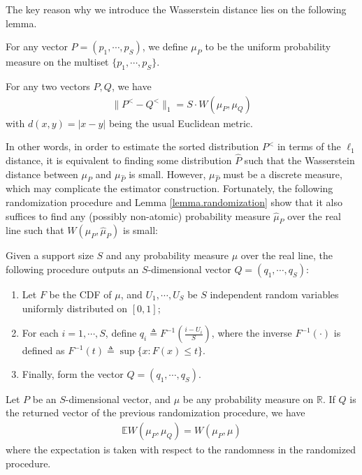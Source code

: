 \documentclass[final,12pt]{colt2018} %
\def \bE {\mathbb{E}}
\begin{document}
The key reason why we introduce the Wasserstein distance lies on the following lemma.
\begin{definition}
For any vector $P=(p_1,\cdots,p_S)$, we define $\mu_P$ to be the uniform probability measure on the multiset $\{p_1,\cdots,p_S\}$.
\end{definition}
\begin{lemma}\label{lemma.wasserstein}
	For any two vectors $P,Q$, we have
	\begin{align*}
	\lVert P^< - Q^< \rVert_1 = S\cdot W(\mu_P,\mu_Q)
	\end{align*}
	with $d(x,y)=|x-y|$ being the usual Euclidean metric.
\end{lemma}

In other words, in order to estimate the sorted distribution $P^<$ in terms of the $\ell_1$ distance, it is equivalent to finding some distribution $\hat{P}$ such that the Wasserstein distance between $\mu_P$ and $\mu_{\hat{P}}$ is small. However, $\mu_{\hat{P}}$ must be a discrete measure, which may complicate the estimator construction. Fortunately, the following randomization procedure and Lemma \ref{lemma.randomization} show that it also suffices to find any (possibly non-atomic) probability measure $\hat{\mu}_P$ over the real line such that $W(\mu_P,\hat{\mu}_P)$ is small: 
\begin{definition}\label{def.randomization}
	Given a support size $S$ and any probability measure $\mu$ over the real line, the following procedure outputs an $S$-dimensional vector $Q=(q_1,\cdots,q_S)$:
	\begin{enumerate}
		\item Let $F$ be the CDF of $\mu$, and $U_1,\cdots,U_S$ be $S$ independent random variables uniformly distributed on $[0,1]$;
		\item For each $i=1,\cdots,S$, define $
		q_i \triangleq F^{-1}\left(\frac{i-U_i}{S}\right) $, 
		where the inverse $F^{-1}(\cdot)$ is defined as
$
		F^{-1}(t) \triangleq \sup\{x: F(x)\le t\}.
$
		\item Finally, form the vector $Q=(q_1,\cdots,q_S)$.
	\end{enumerate}
\end{definition}
\begin{lemma}\label{lemma.randomization}
	Let $P$ be an $S$-dimensional vector, and $\mu$ be any probability measure on $\mathbb{R}$. If $Q$ is the returned vector of the previous randomization procedure, we have
	\begin{align*}
	\bE W(\mu_P,\mu_Q) = W(\mu_P,\mu)
	\end{align*}
	where the expectation is taken with respect to the randomness in the randomized procedure.
\end{lemma}
\end{document}
